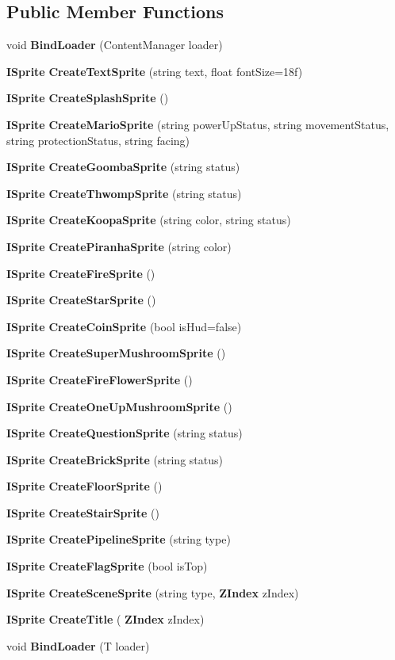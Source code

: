 \subsection*{Public Member Functions}
\begin{DoxyCompactItemize}
\item 
void \textbf{ Bind\+Loader} (Content\+Manager loader)
\item 
\textbf{ I\+Sprite} \textbf{ Create\+Text\+Sprite} (string text, float font\+Size=18f)
\item 
\textbf{ I\+Sprite} \textbf{ Create\+Splash\+Sprite} ()
\item 
\textbf{ I\+Sprite} \textbf{ Create\+Mario\+Sprite} (string power\+Up\+Status, string movement\+Status, string protection\+Status, string facing)
\item 
\textbf{ I\+Sprite} \textbf{ Create\+Goomba\+Sprite} (string status)
\item 
\textbf{ I\+Sprite} \textbf{ Create\+Thwomp\+Sprite} (string status)
\item 
\textbf{ I\+Sprite} \textbf{ Create\+Koopa\+Sprite} (string color, string status)
\item 
\textbf{ I\+Sprite} \textbf{ Create\+Piranha\+Sprite} (string color)
\item 
\textbf{ I\+Sprite} \textbf{ Create\+Fire\+Sprite} ()
\item 
\textbf{ I\+Sprite} \textbf{ Create\+Star\+Sprite} ()
\item 
\textbf{ I\+Sprite} \textbf{ Create\+Coin\+Sprite} (bool is\+Hud=false)
\item 
\textbf{ I\+Sprite} \textbf{ Create\+Super\+Mushroom\+Sprite} ()
\item 
\textbf{ I\+Sprite} \textbf{ Create\+Fire\+Flower\+Sprite} ()
\item 
\textbf{ I\+Sprite} \textbf{ Create\+One\+Up\+Mushroom\+Sprite} ()
\item 
\textbf{ I\+Sprite} \textbf{ Create\+Question\+Sprite} (string status)
\item 
\textbf{ I\+Sprite} \textbf{ Create\+Brick\+Sprite} (string status)
\item 
\textbf{ I\+Sprite} \textbf{ Create\+Floor\+Sprite} ()
\item 
\textbf{ I\+Sprite} \textbf{ Create\+Stair\+Sprite} ()
\item 
\textbf{ I\+Sprite} \textbf{ Create\+Pipeline\+Sprite} (string type)
\item 
\textbf{ I\+Sprite} \textbf{ Create\+Flag\+Sprite} (bool is\+Top)
\item 
\textbf{ I\+Sprite} \textbf{ Create\+Scene\+Sprite} (string type, \textbf{ Z\+Index} z\+Index)
\item 
\textbf{ I\+Sprite} \textbf{ Create\+Title} (\textbf{ Z\+Index} z\+Index)
\item 
void \textbf{ Bind\+Loader} (T loader)
\end{DoxyCompactItemize}
